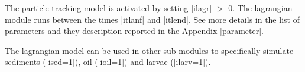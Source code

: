 The particle-tracking model is activated by setting |ilagr| $>$ 0.
The lagrangian module runs between the times |itlanf| and |itlend|.
See more details in the list of parameters and they description 
reported in the Appendix \ref{parameter}.

The lagrangian model can be used in other sub-modules to specifically
simulate sediments (|ised=1|), oil (|ioil=1|) and larvae (|ilarv=1|).

